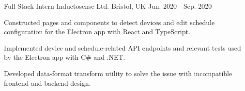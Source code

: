 \begin{cventries}
  \cventry
    {Full Stack Intern} %
    {Inductosense Ltd.} %
    {Bristol, UK} %
    {Jun. 2020 - Sep. 2020} %
    {
      \begin{cvitems} %
        \item {Constructed pages and components to detect devices and edit schedule configuration for the Electron app with React and TypeScript.}
        \item {Implemented device and schedule-related API endpoints and relevant tests used by the Electron app with C\# and .NET.}
        \item {Developed data-format transform utility to solve the issue with incompatible frontend and backend design.}
      \end{cvitems}
    }



\end{cventries}

